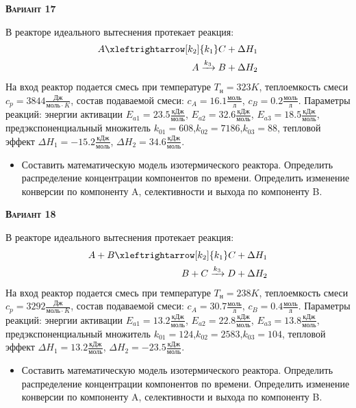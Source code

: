 \textsc{\textbf{Вариант 17}}

 В реакторе идеального вытеснения протекает реакция: \begin{equation*} \begin{aligned} A \xleftrightarrow[k_2]{k_1} C + \Delta H_1 \\ A \xrightarrow{k_3} B + \Delta H_2 \end{aligned} \end{equation*}                              На вход  реактор подается смесь при температуре $ T_{н} =  323 K$, теплоемкость смеси $c_p= 3844 \frac{Дж}{моль \cdot K}$, состав подаваемой смеси: $c_A=16.1 \frac{моль}{л}$, $c_B=0.2 \frac{моль}{л}$. Параметры реакций: энергии активации $E_{a1}=23.5 \frac{кДж}{моль}$, $E_{a2}=32.6  \frac{кДж}{моль}$, $E_{a3}=18.5  \frac{кДж}{моль}$, предэкспоненциальный множитель $k_{01}=       608$,$k_{02}=      7186$,$k_{03}=        88$, тепловой эффект $\Delta H_1= -15.2  \frac{кДж}{моль}$, $\Delta H_2=34.6 \frac{кДж}{моль}$.\begin{itemize} \item Составить математическую модель изотермического реактора. Определить распределение концентрации компонентов по времени. Определить изменение конверсии по компоненту A, селективности и выхода по компоненту B. \end{itemize}

\textsc{\textbf{Вариант 18}}

 В реакторе идеального вытеснения протекает реакция: \begin{equation*} \begin{aligned} A+B \xleftrightarrow[k_2]{k_1} C + \Delta H_1 \\ B + C \xrightarrow{k_3} D + \Delta H_2 \end{aligned} \end{equation*}                        На вход  реактор подается смесь при температуре $ T_{н} =  238 K$, теплоемкость смеси $c_p= 3292 \frac{Дж}{моль \cdot K}$, состав подаваемой смеси: $c_A=30.7 \frac{моль}{л}$, $c_B=0.4 \frac{моль}{л}$. Параметры реакций: энергии активации $E_{a1}=13.2 \frac{кДж}{моль}$, $E_{a2}=22.8  \frac{кДж}{моль}$, $E_{a3}=13.8  \frac{кДж}{моль}$, предэкспоненциальный множитель $k_{01}=       124$,$k_{02}=      2583$,$k_{03}=       104$, тепловой эффект $\Delta H_1= 13.2  \frac{кДж}{моль}$, $\Delta H_2=-23.5 \frac{кДж}{моль}$.\begin{itemize} \item Составить математическую модель изотермического реактора. Определить распределение концентрации компонентов по времени. Определить изменение конверсии по компоненту A, селективности и выхода по компоненту B. \end{itemize}

